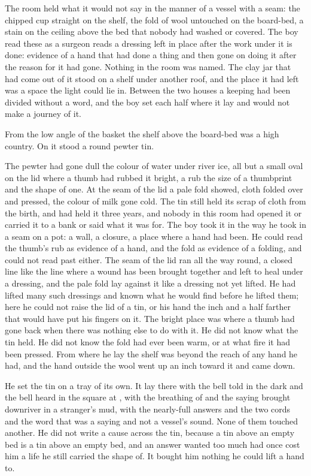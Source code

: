 The room held what it would not say in the manner of a vessel with a seam: the chipped cup straight on the shelf, the fold of wool untouched on the board-bed, a stain on the ceiling above the bed that nobody had washed or covered. The boy read these as a surgeon reads a dressing left in place after the work under it is done: evidence of a hand that had done a thing and then gone on doing it after the reason for it had gone. Nothing in the room was named. The clay jar that had come out of it stood on a shelf under another roof, and the place it had left was a space the light could lie in. Between the two houses a keeping had been divided without a word, and the boy set each half where it lay and would not make a journey of it.

From the low angle of the basket the shelf above the board-bed was a high country. On it stood a round pewter tin.

The pewter had gone dull the colour of water under river ice, all but a small oval on the lid where a thumb had rubbed it bright, a rub the size of a thumbprint and the shape of one. At the seam of the lid a pale fold showed, cloth folded over and pressed, the colour of milk gone cold. The tin still held its scrap of cloth from the birth, and had held it three years, and nobody in this room had opened it or carried it to a bank or said what it was for. The boy took it in the way he took in a seam on a pot: a wall, a closure, a place where a hand had been. He could read the thumb's rub as evidence of a hand, and the fold as evidence of a folding, and could not read past either. The seam of the lid ran all the way round, a closed line like the line where a wound has been brought together and left to heal under a dressing, and the pale fold lay against it like a dressing not yet lifted. He had lifted many such dressings and known what he would find before he lifted them; here he could not raise the lid of a tin, or his hand the inch and a half farther that would have put his fingers on it. The bright place was where a thumb had gone back when there was nothing else to do with it. He did not know what the tin held. He did not know the fold had ever been warm, or at what fire it had been pressed. From where he lay the shelf was beyond the reach of any hand he had, and the hand outside the wool went up an inch toward it and came down.

He set the tin on a tray of its own. It lay there with the bell told in the dark and the bell heard in the square at , with the breathing of  and the saying brought downriver in a stranger's mud, with the nearly-full answers and the two cords and the word that was a saying and not a vessel's sound. None of them touched another. He did not write a cause across the tin, because a tin above an empty bed is a tin above an empty bed, and an answer wanted too much had once cost him a life he still carried the shape of. It bought him nothing he could lift a hand to.

